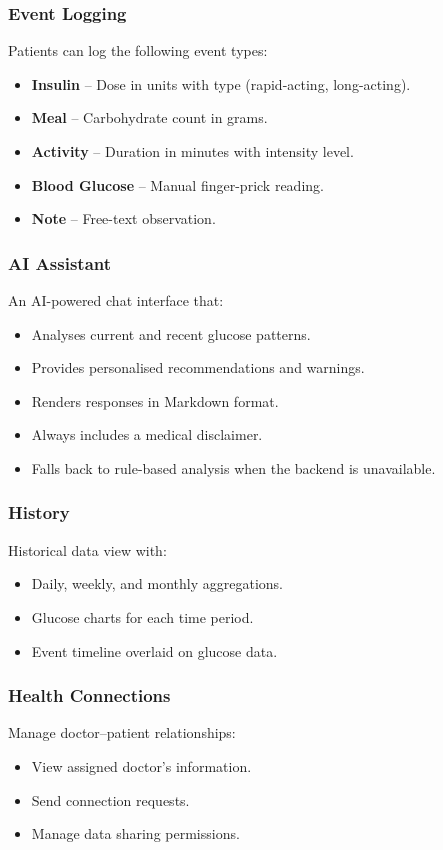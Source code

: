 \documentclass[12pt,a4paper]{article}
\begin{document}
\subsubsection{Event Logging}
Patients can log the following event types:
\begin{itemize}
    \item \textbf{Insulin} -- Dose in units with type (rapid-acting, long-acting).
    \item \textbf{Meal} -- Carbohydrate count in grams.
    \item \textbf{Activity} -- Duration in minutes with intensity level.
    \item \textbf{Blood Glucose} -- Manual finger-prick reading.
    \item \textbf{Note} -- Free-text observation.
\end{itemize}

\subsubsection{AI Assistant}
An AI-powered chat interface that:
\begin{itemize}
    \item Analyses current and recent glucose patterns.
    \item Provides personalised recommendations and warnings.
    \item Renders responses in Markdown format.
    \item Always includes a medical disclaimer.
    \item Falls back to rule-based analysis when the backend is unavailable.
\end{itemize}

\subsubsection{History}
Historical data view with:
\begin{itemize}
    \item Daily, weekly, and monthly aggregations.
    \item Glucose charts for each time period.
    \item Event timeline overlaid on glucose data.
\end{itemize}

\subsubsection{Health Connections}
Manage doctor--patient relationships:
\begin{itemize}
    \item View assigned doctor's information.
    \item Send connection requests.
    \item Manage data sharing permissions.
\end{itemize}
\end{document}
